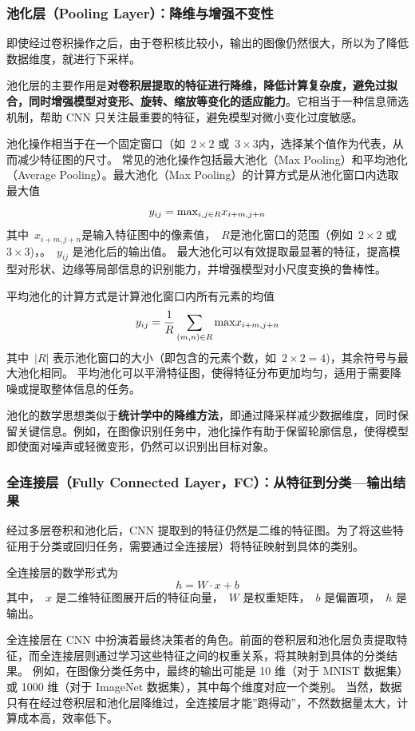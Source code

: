 
\subsubsection*{   池化层（Pooling Layer）：降维与增强不变性  }

即使经过卷积操作之后，由于卷积核比较小，输出的图像仍然很大，所以为了降低数据维度，就进行下采样。

池化层的主要作用是{\bf 对卷积层提取的特征进行降维，降低计算复杂度，避免过拟合，同时增强模型对变形、旋转、缩放等变化的适应能力}。它相当于一种信息筛选机制，帮助 CNN 只关注最重要的特征，避免模型对微小变化过度敏感。

池化操作相当于在一个固定窗口（如~$2\times 2$ 或~$ 3\times 3$内，选择某个值作为代表，从而减少特征图的尺寸。
常见的池化操作包括最大池化（Max Pooling）和平均池化（Average Pooling）。最大池化（Max Pooling）的计算方式是从池化窗口内选取最大值
$$
y_{ij}  ={\rm max}_{i,j \in R} x_{i+m, j+n}
$$
其中~$x_{i+m, j+n}$是输入特征图中的像素值，~$R$是池化窗口的范围（例如~$2\times 2$ 或~$ 3\times 3$)，。~$y_{ij}$ 是池化后的输出值。  
最大池化可以有效提取最显著的特征，提高模型对形状、边缘等局部信息的识别能力，并增强模型对小尺度变换的鲁棒性。

平均池化的计算方式是计算池化窗口内所有元素的均值
$$
y_{ij}  =\frac{1}{R} \sum_{(m,n)\in R}{\rm max} x_{i+m, j+n}
$$
其中~$|R|$ 表示池化窗口的大小（即包含的元素个数，如~$2\times 2=4$)，其余符号与最大池化相同。
平均池化可以平滑特征图，使得特征分布更加均匀，适用于需要降噪或提取整体信息的任务。

池化的数学思想类似于{\bf 统计学中的降维方法}，即通过降采样减少数据维度，同时保留关键信息。例如，在图像识别任务中，池化操作有助于保留轮廓信息，使得模型即使面对噪声或轻微变形，仍然可以识别出目标对象。

\subsubsection*{   全连接层（Fully Connected Layer，FC）：从特征到分类---输出结果}
经过多层卷积和池化后，CNN 提取到的特征仍然是二维的特征图。为了将这些特征用于分类或回归任务，需要通过全连接层）将特征映射到具体的类别。

全连接层的数学形式为
$$
h = W\cdot x + b
$$
其中，~$x$ 是二维特征图展开后的特征向量，~$W$ 是权重矩阵，~$b$ 是偏置项，~$h$ 是输出。

全连接层在 CNN 中扮演着最终决策者的角色。前面的卷积层和池化层负责提取特征，而全连接层则通过学习这些特征之间的权重关系，将其映射到具体的分类结果。
例如，在图像分类任务中，最终的输出可能是 10 维（对于 MNIST 数据集）或 1000 维（对于 ImageNet 数据集），其中每个维度对应一个类别。
当然，数据只有在经过卷积层和池化层降维过，全连接层才能”跑得动”，不然数据量太大，计算成本高，效率低下。

